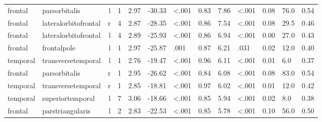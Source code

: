 \documentclass{article}
\begin{document}
\begin{longtable}{llrR{1.5cm}R{1cm}R{1.3cm}R{1cm}R{1cm}R{1.3cm}R{1cm}R{1.8cm}R{1.3cm}R{1.8cm}}
\bottomrule
\endlastfoot
   frontal &             parsorbitalis &    l &            1 &                  2.97 &           -30.33 &      \textless.001 &                               0.83 &                          7.86 &                   \textless.001 &  0.08 &   76.0 &      0.54 \\
   frontal &      lateralorbitofrontal &    r &            4 &                  2.87 &           -28.35 &      \textless.001 &                               0.86 &                          7.54 &                   \textless.001 &  0.08 &   29.5 &      0.46 \\
   frontal &      lateralorbitofrontal &    l &            4 &                  2.89 &           -25.93 &      \textless.001 &                               0.86 &                          6.94 &                   \textless.001 &  0.00 &   27.0 &      0.43 \\
   frontal &               frontalpole &    l &            1 &                  2.97 &           -25.87 &               .001 &                               0.87 &                          6.21 &                            .031 &  0.02 &   12.0 &      0.40 \\
  temporal &        transversetemporal &    l &            1 &                  2.76 &           -19.47 &      \textless.001 &                               0.96 &                          6.11 &                   \textless.001 &  0.01 &    6.0 &      0.37 \\
   frontal &             parsorbitalis &    r &            1 &                  2.95 &           -26.62 &      \textless.001 &                               0.84 &                          6.08 &                   \textless.001 &  0.08 &   83.0 &      0.54 \\
  temporal &        transversetemporal &    r &            1 &                  2.85 &           -18.81 &      \textless.001 &                               0.97 &                          6.02 &                   \textless.001 &  0.01 &   12.0 &      0.42 \\
  temporal &          superiortemporal &    l &            7 &                  3.06 &           -18.66 &      \textless.001 &                               0.85 &                          5.94 &                   \textless.001 &  0.02 &    8.0 &      0.38 \\
   frontal &          parstriangularis &    l &            2 &                  2.83 &           -22.53 &      \textless.001 &                               0.85 &                          5.78 &                   \textless.001 &  0.10 &   56.0 &      0.50 \\

\end{longtable}
\end{document}
